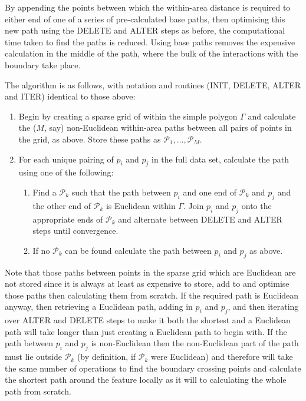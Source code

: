 \documentclass[useAMS, referee]{biom}
\begin{document}
By appending the points between which the within-area distance is required to either end of one of a series of pre-calculated base paths, then optimising this new path using the DELETE and ALTER steps as before,  the computational time taken to find the paths is reduced. Using base paths removes the expensive calculation in the middle of the path, where the bulk of the interactions with the boundary take place.

The algorithm is as follows, with notation and routines (INIT, DELETE, ALTER and ITER) identical to those above:
\begin{enumerate}
 \item Begin by creating a sparse grid of within the simple polygon $\Gamma$ and calculate the ($M$, say) non-Euclidean within-area paths between all pairs of points in the grid, as above. Store these paths as $\mathcal{P}_1,\ldots, \mathcal{P}_M$.
\item For each unique pairing of $p_i$ and $p_j$ in the full data set, calculate the path using one of the following:
\begin{enumerate}
\item Find a $\mathcal{P}_k$ such that the path between $p_i$ and one end of $\mathcal{P}_k$ and $p_j$ and the other end of $\mathcal{P}_k$ is Euclidean within $\Gamma$. Join $p_i$ and $p_j$ onto the appropriate ends of $\mathcal{P}_k$ and alternate between DELETE and ALTER steps until convergence.
\item If no $\mathcal{P}_k$ can be found calculate the path between $p_i$ and $p_j$ as above. 
\end{enumerate}
\end{enumerate}

Note that those paths between points in the sparse grid which are Euclidean are not stored since it is always at least as expensive to store, add to and optimise those paths then calculating them from scratch. If the required path is Euclidean anyway, then retrieving a Euclidean path, adding in $p_i$ and $p_j$, and then iterating over ALTER and DELETE steps to make it both the shortest and a Euclidean path will take longer than just creating a Euclidean path to begin with. If the path between $p_i$ and $p_j$ is non-Euclidean then the non-Euclidean part of the path must lie outside $\mathcal{P}_k$ (by definition, if $\mathcal{P}_k$ were Euclidean) and therefore will take the same number of operations to find the boundary crossing points and calculate the shortest path around the feature locally as it will to calculating the whole path from scratch.
\end{document}
